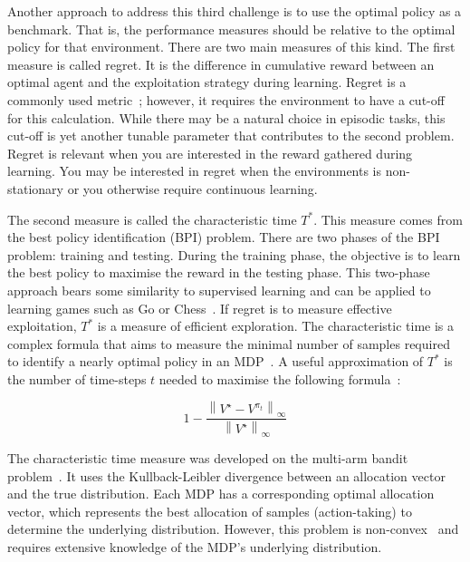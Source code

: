 \documentclass[]{final_report}
\begin{document}
Another approach to address this third challenge is to use the optimal policy as a benchmark. That is, the performance measures should be relative to the optimal policy for that environment. There are two main measures of this kind. The first measure is called regret. It is the difference in cumulative reward between an optimal agent and the exploitation strategy during learning. Regret is a commonly used metric~\cite{modelFree}; however, it requires the environment to have a cut-off for this calculation. While there may be a natural choice in episodic tasks, this cut-off is yet another tunable parameter that contributes to the second problem. Regret is relevant when you are interested in the reward gathered during learning. You may be interested in regret when the environments is non-stationary  or you otherwise require continuous learning.

\label{bpi-introduction}
The second measure is called the characteristic time $T^*$. This measure comes from the best policy identification (BPI) problem. There are two phases of the BPI problem: training and testing. During the training phase, the objective is to learn the best policy to maximise the reward in the testing phase. This two-phase approach bears some similarity to supervised learning and can be applied to learning games such as Go or Chess~\cite{bestPolicyIdentifaction}. If regret is to measure effective exploitation, $T^*$ is a measure of efficient exploration. The characteristic time is a complex formula that aims to measure the minimal number of samples required to identify a nearly optimal policy in an MDP~\cite{characteristicTime}. A useful approximation of $T^*$ is the number of time-steps $t$ needed to maximise the following formula~\cite{modelFree}:

\begin{equation}
  1- \frac{ \left\|V^\star-V^{\pi_t} \right\|_\infty}{\left\|V^\star\right\|_\infty}
  \label{eqn:characteristic-time-aproximation}
\end{equation}
 
The characteristic time measure was developed on the multi-arm bandit problem~\cite{characteristicTime}. It uses the Kullback-Leibler divergence between an allocation vector and the true distribution. Each MDP has a corresponding optimal allocation vector, which represents the best allocation of samples (action-taking) to determine the underlying distribution. However, this problem is non-convex~\cite{characteristicTimeNonConvex} and requires extensive knowledge of the MDP's underlying distribution.
\end{document}
